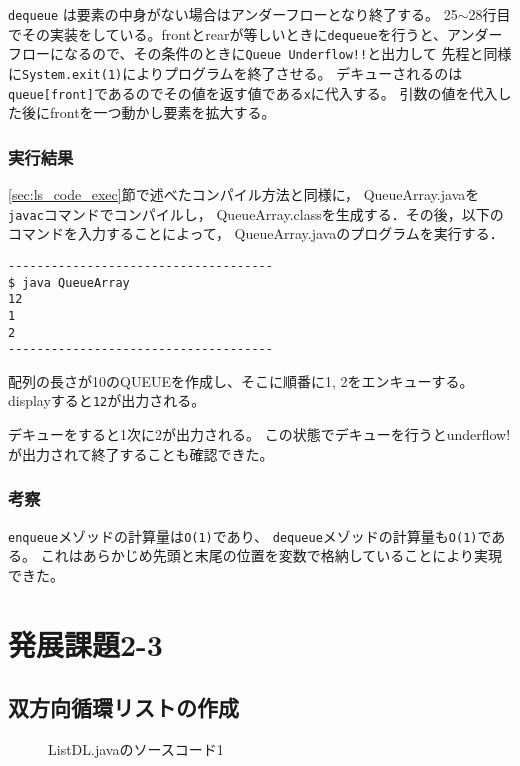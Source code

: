 \documentclass[10.5pt,a4paper]{jsarticle}
\newcommand{\secref}[1]{\ref{#1}節}
\begin{document}
\texttt{dequeue}
は要素の中身がない場合はアンダーフローとなり終了する。
25$\sim$28行目でその実装をしている。frontとrearが等しいときに\texttt{dequeue}を行うと、アンダーフローになるので、その条件のときに\texttt{Queue Underflow!!}と出力して
先程と同様に\texttt{System.exit(1)}によりプログラムを終了させる。
デキューされるのは\texttt{queue[front]}であるのでその値を返す値である\texttt{x}に代入する。
引数の値を代入した後にfrontを一つ動かし要素を拡大する。

\subsubsection{実行結果}

\secref{sec:ls_code_exec}で述べたコンパイル方法と同様に，
QueueArray.javaを\texttt{javac}コマンドでコンパイルし，
QueueArray.classを生成する．その後，以下のコマンドを入力することによって，
QueueArray.javaのプログラムを実行する．

\begin{verbatim}
-------------------------------------
$ java QueueArray
12
1
2
-------------------------------------
\end{verbatim}

配列の長さが10のQUEUEを作成し、そこに順番に1, 2をエンキューする。
displayすると\texttt{12}が出力される。

デキューをすると1次に2が出力される。
この状態でデキューを行うとunderflow!が出力されて終了することも確認できた。

\subsubsection{考察}
\texttt{enqueue}メゾッドの計算量は\texttt{O(1)}であり、
\texttt{dequeue}メゾッドの計算量も\texttt{O(1)}である。
これはあらかじめ先頭と末尾の位置を変数で格納していることにより実現できた。

\section{発展課題2-3}

\subsection{双方向循環リストの作成}

\begin{figure}[t]
  \begin{center}
   
   \caption{ListDL.javaのソースコード1}
   \label{code:ListDL}
  \end{center}
\end{figure}
\end{document}

